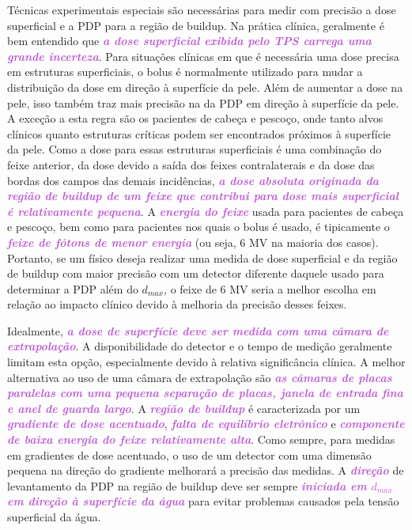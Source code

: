 \documentclass[11pt,a4paper]{article}
\begin{document}
	Técnicas experimentais especiais são necessárias para medir com precisão a dose superficial e a PDP para a região de buildup. Na prática clínica, geralmente é bem entendido que \textcolor{MediumOrchid}{\textbf{\textit{a dose superficial exibida pelo TPS carrega uma grande incerteza}}}. Para situações clínicas em que é necessária uma dose precisa em estruturas superficiais, o bolus é normalmente utilizado para mudar a distribuição da dose em direção à superfície da pele. Além de aumentar a dose na pele, isso também traz  mais precisão na da PDP em direção à superfície da pele. A exceção a esta regra  são os pacientes de cabeça e pescoço, onde tanto alvos clínicos quanto estruturas críticas podem ser encontrados próximos à superfície da pele. Como a dose para essas estruturas superficiais é uma combinação do feixe anterior, da dose devido a saída dos feixes contralaterais e da dose das bordas dos campos das demais incidências, \textcolor{MediumOrchid}{\textbf{\textit{a dose absoluta originada da região de buildup de um feixe que contribui para dose mais superficial é relativamente pequena}}}. A \textcolor{MediumOrchid}{\textbf{\textit{energia do feixe}}} usada para pacientes de cabeça e pescoço, bem como para pacientes nos quais o bolus é usado, é tipicamente o \textcolor{MediumOrchid}{\textbf{\textit{feixe de fótons de menor energia}}} (ou seja, 6 MV na maioria dos casos). Portanto, se um físico deseja realizar uma medida de dose superficial e da região de buildup com  maior precisão com um detector diferente daquele usado para determinar a PDP além do $d_{max}$, o feixe de 6 MV seria a melhor escolha em relação ao impacto clínico devido à melhoria da precisão desses feixes.

	Idealmente, \textcolor{MediumOrchid}{\textbf{\textit{a dose de superfície deve ser medida com uma câmara de extrapolação}}}. A disponibilidade do detector e o tempo de medição geralmente limitam esta opção, especialmente devido à relativa significância clínica. A melhor alternativa ao uso de uma câmara de extrapolação são \textcolor{MediumOrchid}{\textbf{\textit{as câmaras de placas paralelas com uma pequena separação de placas, janela de entrada fina e anel de guarda largo}}}. A \textcolor{MediumOrchid}{\textbf{\textit{região de buildup}}} é caracterizada por um \textcolor{MediumOrchid}{\textbf{\textit{gradiente de dose acentuado}}}, \textcolor{MediumOrchid}{\textbf{\textit{falta de equilíbrio eletrônico}}} e \textcolor{MediumOrchid}{\textbf{\textit{componente de baixa energia do feixe relativamente alta}}}. Como sempre, para medidas em gradientes de dose acentuado, o uso de um detector com uma dimensão pequena na direção do gradiente melhorará a precisão das medidas. A \textcolor{MediumOrchid}{\textbf{\textit{direção}}} de levantamento da PDP na região de buildup deve ser sempre \textcolor{MediumOrchid}{\textbf{\textit{iniciada em $d_{max}$ em direção à superfície da água}}} para evitar problemas causados pela tensão superficial da água.
\end{document}
